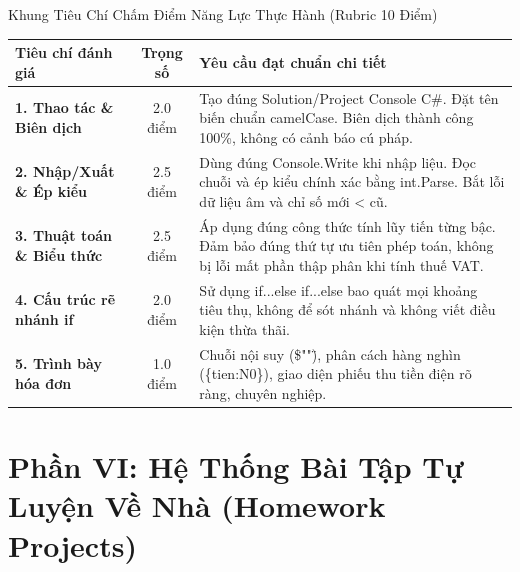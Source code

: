 \documentclass[aspectratio=169, 10pt]{beamer}
\begin{document}
\begin{frame}{Khung Tiêu Chí Chấm Điểm Năng Lực Thực Hành (Rubric 10 Điểm)}
  \begin{table}[h]
    \centering
    \small
    \begin{tabularx}{\textwidth}{lcp{9.5cm}}
      \toprule
      \textbf{Tiêu chí đánh giá} & \textbf{Trọng số} & \textbf{Yêu cầu đạt chuẩn chi tiết} \\
      \midrule
      \textbf{1. Thao tác \& Biên dịch} & 2.0 điểm & Tạo đúng Solution/Project Console C\#. Đặt tên biến chuẩn camelCase. Biên dịch thành công 100\%, không có cảnh báo cú pháp. \\
      \addlinespace
      \textbf{2. Nhập/Xuất \& Ép kiểu} & 2.5 điểm & Dùng đúng Console.Write khi nhập liệu. Đọc chuỗi và ép kiểu chính xác bằng int.Parse. Bắt lỗi dữ liệu âm và chỉ số mới < cũ. \\
      \addlinespace
      \textbf{3. Thuật toán \& Biểu thức} & 2.5 điểm & Áp dụng đúng công thức tính lũy tiến từng bậc. Đảm bảo đúng thứ tự ưu tiên phép toán, không bị lỗi mất phần thập phân khi tính thuế VAT. \\
      \addlinespace
      \textbf{4. Cấu trúc rẽ nhánh if} & 2.0 điểm & Sử dụng if...else if...else bao quát mọi khoảng tiêu thụ, không để sót nhánh và không viết điều kiện thừa thãi. \\
      \addlinespace
      \textbf{5. Trình bày hóa đơn} & 1.0 điểm & Chuỗi nội suy (\$""\"), phân cách hàng nghìn (\{tien:N0\}), giao diện phiếu thu tiền điện rõ ràng, chuyên nghiệp. \\
      \bottomrule
    \end{tabularx}
  \end{table}
\end{frame}

\section{Phần VI: Hệ Thống Bài Tập Tự Luyện Về Nhà (Homework Projects)}
\end{document}

